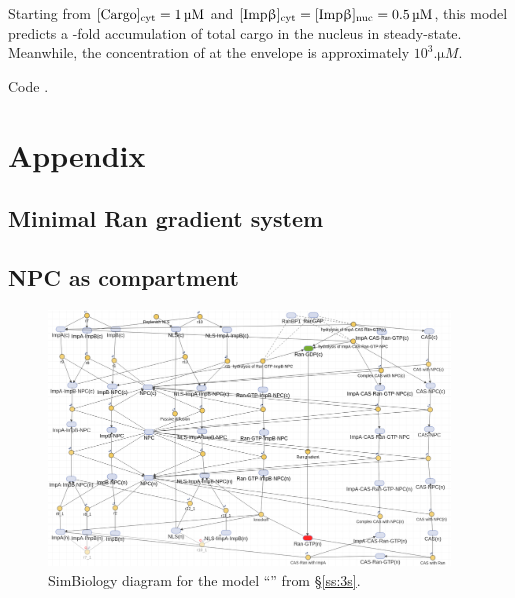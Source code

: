 \documentclass[12pt,notitlepage]{article}
\begin{document}
%

Starting from 
$[\ce{Cargo}]_\text{cyt} = \SI{1}{\micro M}$
and
$[\ce{Imp\beta}]_\text{cyt} = [\ce{Imp\beta}]_\text{nuc} = \SI{0.5}{\micro M}$,
this model
predicts a 
\protect\unskip%
-fold accumulation
of total cargo in the nucleus
in steady-state.
%
Meanwhile,
the concentration of 
at the envelope is approximately $10^3 \si{. \micro M}$.

Code .








\clearpage
\renewcommand*{\bibfont}{\normalfont\small}
\printbibliography %



\clearpage


\section{Appendix}


\subsection{Minimal Ran gradient system} \label{ss:app:gsr-ran}




\subsection{NPC as compartment} \label{ss:app:3s}


\begin{figure}
	\centering
	\includegraphics[width=0.95\textwidth]{20211018-Appli/threestage}
	\caption{%
		SimBiology diagram for the model 
		``'' from \S\ref{ss:3s}.
	}
	\label{f:app:3s-simbio}
\end{figure}
\end{document}
